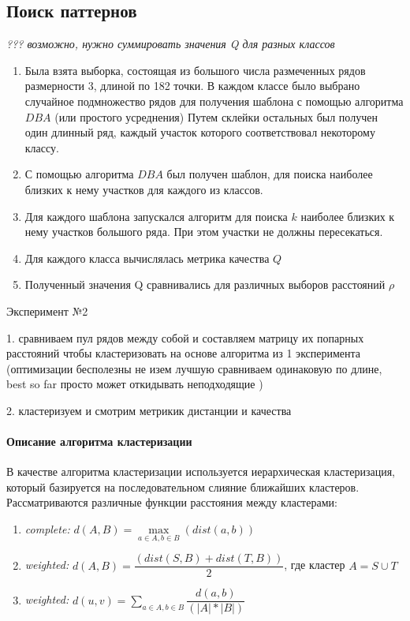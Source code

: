 \documentclass[12pt,twoside]{article}
\begin{document}
        \subsection{Поиск паттернов}
        \textit{??? возможно, нужно суммировать значения Q для разных классов}
        \begin{enumerate}
            \item Была взята выборка, состоящая из большого числа размеченных рядов размерности $3$, длиной по 182 точки.
                В каждом классе было выбрано случайное подмножество рядов для получения шаблона с помощью алгоритма $DBA$ (или простого усреднения)
                Путем склейки остальных был получен один длинный ряд, каждый участок которого соответствовал некоторому классу.
            \item С помощью алгоритма $DBA$ был получен шаблон, для поиска наиболее близких к нему участков для каждого из классов.
            \item Для каждого шаблона запускался алгоритм для поиска $k$ наиболее близких к нему участков большого ряда.
                При этом участки не должны пересекаться.
            \item Для каждого класса вычислялась метрика качества $Q$
            \item Полученный значения Q сравнивались для различных выборов расстояний $\rho$
        \end{enumerate}
        
        Эксперимент №2
        
        1. сравниваем пул рядов между собой и составляем матрицу их попарных расстояний чтобы кластеризовать на
        основе алгоритма из 1 эксперимента (оптимизации бесполезны не изем лучшую сравниваем одинаковую по длине,
        best so far просто может откидывать неподходящие )
        
        2. кластеризуем и смотрим метрикик дистанции и качества
						
						
      \iffalse
		    \paragraph{Описание алгоритма кластеризации}      
            В качестве алгоритма кластеризации используется иерархическая кластеризация, который базируется на последовательном слияние ближайших кластеров.
            Рассматриваются различные функции расстояния между кластерами: 
            \begin{enumerate}
                \item \textit{complete:}  $d(A, B) = \max\limits_{a \in A, b \in B}(dist(a, b))$ 
                \item \textit{weighted:}  $d(A,B) = \dfrac{(dist(S,B) + dist(T,B))}{2}$, где кластер $A = S \cup T$
                \item \textit{weighted:}  $d(u,v) = \sum\limits_{a \in A, b \in B} \dfrac{d(a, b)}{(|A|*|B|)}$ 
            \end{enumerate} 
\end{document}
